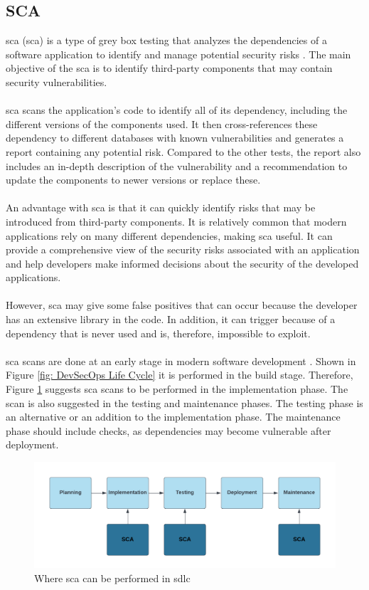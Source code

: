 \subsection{SCA}
\acrlong{sca} (\acrshort{sca}) is a type of grey box testing that analyzes the dependencies of a software application to identify and manage potential security risks \cite{sca}. The main objective of the \acrshort{sca} is to identify third-party components that may contain security vulnerabilities. 
\\~\\
\acrshort{sca} scans the application's code to identify all of its \gls{dependency}, including the different versions of the components used. It then cross-references these \gls{dependency} to different databases with known vulnerabilities and generates a report containing any potential risk. Compared to the other tests, the report also includes an in-depth description of the vulnerability and a recommendation to update the components to newer versions or replace these. 
\\~\\
An advantage with \acrshort{sca} is that it can quickly identify risks that may be introduced from third-party components. It is relatively common that modern applications rely on many different dependencies, making \acrshort{sca} useful. It can provide a comprehensive view of the security risks associated with an application and help developers make informed decisions about the security of the developed applications. 
\\~\\
However, \acrshort{sca} may give some false positives that can occur because the developer has an extensive library in the code. In addition, it can trigger because of a dependency that is never used and is, therefore, impossible to exploit.
\\~\\
\acrshort{sca} scans are done at an early stage in modern software development \cite{scaplasment}. Shown in Figure \ref{fig: DevSecOps Life Cycle} it is performed in the build stage. Therefore, Figure \ref{fig: Where SCA can be performed in SDLC} suggests \acrshort{sca} scans to be performed in the implementation phase. The scan is also suggested in the testing and maintenance phases. The testing phase is an alternative or an addition to the implementation phase. The maintenance phase should include checks, as dependencies may become vulnerable after deployment.

\vspace{2mm}
\begin{figure}[H]
    \centering
    \includegraphics[width=0.8\columnwidth]{Images/sca.png}
    \caption{Where \acrshort{sca} can be performed in \acrshort{sdlc}} 
    \label{fig: Where SCA can be performed in SDLC}
\end{figure}

